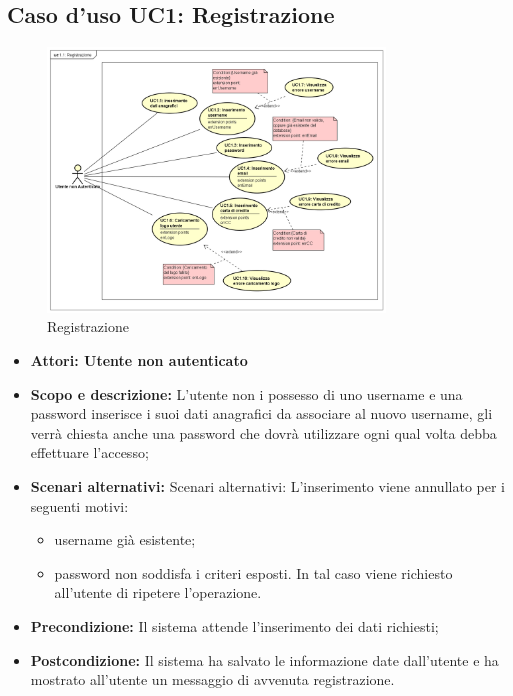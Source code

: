 \documentclass[12pt,a4paper,titlepage]{article}
\begin{document}
	\subsection{Caso d'uso UC1: Registrazione}
	\label{UC1}
	\begin{figure}[ht]
		\centering
		\includegraphics[width=0.8\textwidth]{UseCase/Registrazione}
		\caption{Registrazione}
	\end{figure}
	\begin{itemize}
		\item \textbf{Attori: Utente non autenticato}
		\item \textbf{Scopo e descrizione:} L'utente non i possesso di uno username e una password inserisce i suoi dati anagrafici da associare al nuovo username, gli verrà chiesta anche una password che dovrà utilizzare ogni qual volta debba effettuare l'accesso;
		\item \textbf{Scenari alternativi:} Scenari alternativi: L'inserimento viene annullato per i seguenti motivi:
		\begin{itemize}
			\item username già esistente;
			\item password non soddisfa i criteri esposti. In tal caso viene richiesto all'utente di ripetere l'operazione.
		\end{itemize}
		\item \textbf{Precondizione:} Il sistema attende l'inserimento dei dati richiesti;
		\item \textbf{Postcondizione:} Il sistema ha salvato le informazione date dall'utente e ha mostrato all'utente un messaggio di avvenuta registrazione.
	\end{itemize}
\end{document}
